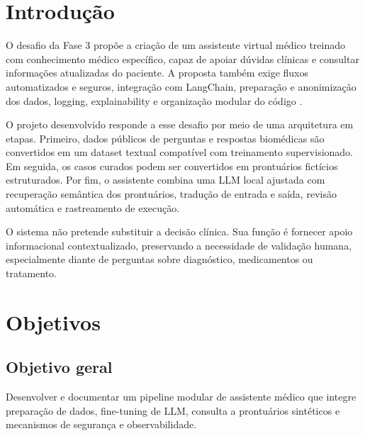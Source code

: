 \documentclass[12pt,a4paper]{article}
\begin{document}
\tableofcontents
\newpage
{}

\section{Introdução}

O desafio da Fase 3 propõe a criação de um assistente virtual médico treinado com conhecimento médico específico, capaz de apoiar dúvidas clínicas e consultar informações atualizadas do paciente. A proposta também exige fluxos automatizados e seguros, integração com LangChain, preparação e anonimização dos dados, logging, explainability e organização modular do código \cite{especificacao}.

O projeto desenvolvido responde a esse desafio por meio de uma arquitetura em etapas. Primeiro, dados públicos de perguntas e respostas biomédicas são convertidos em um dataset textual compatível com treinamento supervisionado. Em seguida, os casos curados podem ser convertidos em prontuários fictícios estruturados. Por fim, o assistente combina uma LLM local ajustada com recuperação semântica dos prontuários, tradução de entrada e saída, revisão automática e rastreamento de execução.

O sistema não pretende substituir a decisão clínica. Sua função é fornecer apoio informacional contextualizado, preservando a necessidade de validação humana, especialmente diante de perguntas sobre diagnóstico, medicamentos ou tratamento.

\section{Objetivos}

\subsection{Objetivo geral}
Desenvolver e documentar um pipeline modular de assistente médico que integre preparação de dados, fine-tuning de LLM, consulta a prontuários sintéticos e mecanismos de segurança e observabilidade.
\end{document}
